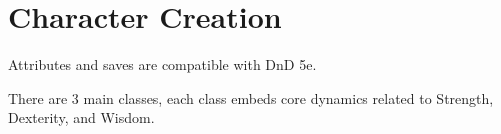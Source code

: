 \chapter{Character Creation}


Attributes and saves are compatible with DnD 5e.


There are 3 main classes, each class embeds core dynamics related to Strength, Dexterity, and Wisdom.








